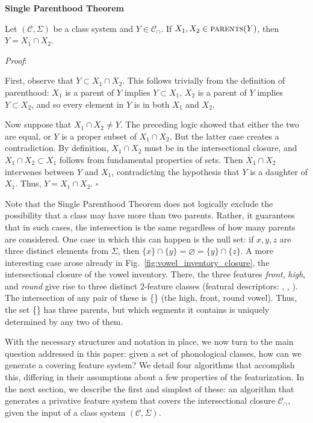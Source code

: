\documentclass[11pt, oneside]{article}   	%
\begin{document}
\vspace{\baselineskip} \noindent \textbf{Single Parenthood Theorem}

Let $(\mathcal C, \Sigma)$ be a class system and $Y \in \mathcal C_\cap$. If $X_1, X_2 \in \textsc{parents}(Y)$, then $Y = X_1 \cap X_2$.

\vspace{\baselineskip} \noindent \textit{Proof}:

First, observe that $Y \subset X_1 \cap X_2$. This follows trivially from the definition of parenthood: $X_1$ is a parent of $Y$ implies $Y \subset X_1$, $X_2$ is a parent of $Y$ implies $Y \subset X_2$, and so every element in $Y$ is in both $X_1$ and $X_2$.

Now suppose that $X_1 \cap X_2 \neq Y$. The preceding logic showed that either the two are equal, or $Y$ is a proper subset of $X_1 \cap X_2$. But the latter case creates a contradiction. By definition, $X_1 \cap X_2$ must be in the intersectional closure, and $X_1 \cap X_2 \subset X_1$ follows from fundamental properties of sets. Then $X_1 \cap X_2$ intervenes between $Y$ and $X_1$, contradicting the hypothesis that $Y$ is a daughter of $X_1$. Thus, $Y = X_1 \cap X_2$. $\square$
	
\vspace{\baselineskip} Note that the Single Parenthood Theorem does not logically exclude the possibility that a class may have more than two parents. Rather, it guarantees that in such cases, the intersection is the same regardless of how many parents are considered. One case in which this can happen is the null set: if $x, y, z$ are three distinct elements from $\Sigma$, then $\{ x \} \cap \{ y \} = \varnothing = \{ y \} \cap \{ z \}$. A more interesting case arose already in Fig.~\ref{fig:vowel_inventory_closure}, the intersectional closure of the vowel inventory. There, the three features \textit{front}, \textit{high}, and \textit{round} give rise to three distinct 2-feature classes (featural descriptors: , , ). The intersection of any pair of these is \{\} (the high, front, round vowel). Thus, the set  \{\} has three parents, but which segments it contains is uniquely determined by any two of them.

With the necessary structures and notation in place, we now turn to the main question addressed in this paper: given a set of phonological classes, how can we generate a covering feature system? We detail four algorithms that accomplish this, differing in their assumptions about a few properties of the featurization. In the next section, we describe the first and simplest of these: an algorithm that generates a privative feature system that covers the intersectional closure $\mathcal C_\cap$, given the input of a class system $(\mathcal C, \Sigma)$.
\end{document}
